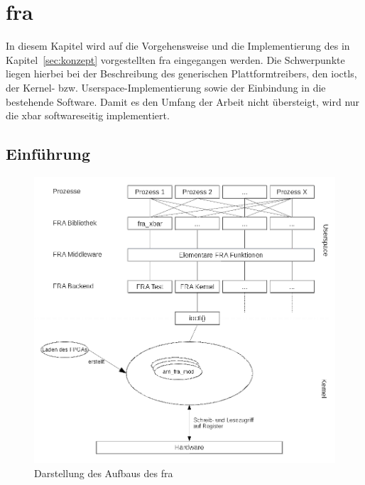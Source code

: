 \chapter{\acl{fra}} \label{sec:haupt}
In diesem Kapitel wird auf die  Vorgehensweise und die Implementierung des in Kapitel~\ref{sec:konzept} vorgestellten \ac{fra} eingegangen werden. Die Schwerpunkte liegen hierbei bei der Beschreibung des generischen Plattformtreibers, den \ac{ioctl}s, der Kernel- bzw. Userspace-Implementierung sowie der Einbindung in die bestehende Software. Damit es den Umfang der Arbeit nicht übersteigt, wird nur die \ac{xbar} softwareseitig implementiert.

\section{Einführung}

\begin{figure}[!hbtp]
	\centering
	\includegraphics[width = \linewidth]{pictures/2020-01-10_FRA_Overview.png}
	\smallskip
	\caption{Darstellung des Aufbaus des \ac{fra}}
	\label{fig:overview}
\end{figure} 

